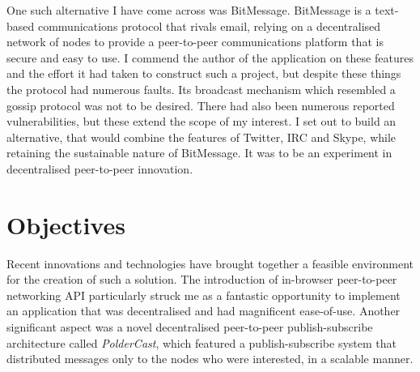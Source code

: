 \documentclass[10pt,a4paper,onecolumn]{article}
\begin{document}
One such alternative I have come across was BitMessage. BitMessage is a text-based communications protocol that rivals email, relying on a decentralised network of nodes to provide a peer-to-peer communications platform that is secure and easy to use. I commend the author of the application on these features and the effort it had taken to construct such a project, but despite these things the protocol had numerous faults. Its broadcast mechanism which resembled a gossip protocol was not to be desired. There had also been numerous reported vulnerabilities, but these extend the scope of my interest. I set out to build an alternative, that would combine the features of Twitter, IRC and Skype, while retaining the sustainable nature of BitMessage. It was to be an experiment in decentralised peer-to-peer innovation.

\section{Objectives}
Recent innovations and technologies have brought together a feasible environment for the creation of such a solution. The introduction of in-browser peer-to-peer networking API particularly struck me as a fantastic opportunity to implement an application that was decentralised and had magnificent ease-of-use. Another significant aspect was a novel decentralised peer-to-peer publish-subscribe architecture called \textit{PolderCast}, which featured a publish-subscribe system that distributed messages only to the nodes who were interested, in a scalable manner.
\end{document}

